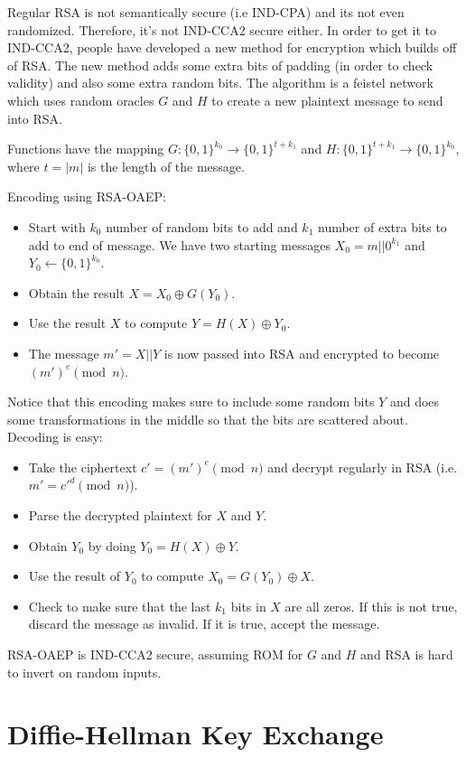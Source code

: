 \documentclass[psamsfonts]{amsart}
\begin{document}
Regular RSA is not semantically secure (i.e IND-CPA) and its not even randomized. Therefore, it's not IND-CCA2 secure either. In order to get it to IND-CCA2, people have developed a new method for encryption which builds off of RSA. The new method adds some extra bits of padding (in order to check validity) and also some extra random bits. The algorithm is a feistel network which uses random oracles $G$ and $H$ to create a new plaintext message to send into RSA.

Functions have the mapping $G: \{0,1\}^{k_0} \to \{0,1\}^{t + k_1}$ and $H: \{0,1\}^{t + k_1} \to \{0,1\}^{k_0}$, where $t = |m|$ is the length of the message.

Encoding using RSA-OAEP:
\begin{itemize}
  \item Start with $k_0$ number of random bits to add and $k_1$ number of extra bits to add to end of message. We have two starting messages $X_0 = m || 0^{k_1}$ and $Y_0 \leftarrow \{0,1\}^{k_0}$.
  \item Obtain the result $X = X_0 \oplus G(Y_0)$.
  \item Use the result $X$ to compute $Y = H(X) \oplus Y_0$.
  \item The message $m' = X || Y$ is now passed into RSA and encrypted to become $(m')^e \pmod{n}$.
\end{itemize}

Notice that this encoding makes sure to include some random bits $Y$ and does some transformations in the middle so that the bits are scattered about. Decoding is easy:
\begin{itemize}
  \item Take the ciphertext $c' = (m')^e \pmod{n}$ and decrypt regularly in RSA (i.e. $m' = c'^d \pmod{n}$).
  \item Parse the decrypted plaintext for $X$ and $Y$.
  \item Obtain $Y_0$ by doing $Y_0 = H(X) \oplus Y$.
  \item Use the result of $Y_0$ to compute $X_0 = G(Y_0) \oplus X$.
  \item Check to make sure that the last $k_1$ bits in $X$ are all zeros. If this is not true, discard the message as invalid. If it is true, accept the message.
\end{itemize}

RSA-OAEP is IND-CCA2 secure, assuming ROM for $G$ and $H$ and RSA is hard to invert on random inputs.

\section{Diffie-Hellman Key Exchange}
\end{document}
